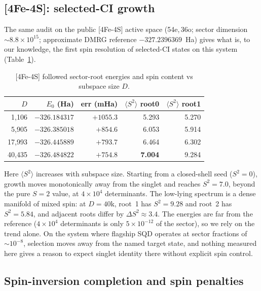 \documentclass[11pt]{article}
\newcommand{\ssq}{\ensuremath{\langle S^2\rangle}}
\begin{document}
\subsection{[4Fe-4S]: selected-CI growth}\label{sec:fe4s4}

The same audit on the public [4Fe-4S] active space (54e,\,36o; sector dimension ${\sim}8.8\times10^{15}$; approximate DMRG reference $-327.2396369$~Ha) gives what is, to our knowledge, the first spin resolution of selected-CI states on this system (Table~\ref{tab:fe4s4}).

\begin{table}[ht]\centering\small
\caption{[4Fe-4S] followed sector-root energies and spin content vs subspace size $D$.}
\label{tab:fe4s4}
\begin{tabular}{rrrrr}
\toprule
$D$ & $E_0$ (Ha) & err (mHa) & \ssq{} root0 & \ssq{} root1 \\
\midrule
1{,}106 & $-326.184317$ & $+1055.3$ & 5.293 & 5.270 \\
5{,}905 & $-326.385018$ & $+854.6$ & 6.053 & 5.914 \\
17{,}993 & $-326.445889$ & $+793.7$ & 6.464 & 6.302 \\
40{,}435 & $-326.484822$ & $+754.8$ & \textbf{7.004} & 9.284 \\
\bottomrule
\end{tabular}
\end{table}

Here \ssq{} increases with subspace size. Starting from a closed-shell seed ($S^2=0$), growth moves monotonically away from the singlet and reaches $S^2=7.0$, beyond the pure $S=2$ value, at $4\times10^4$ determinants. The low-lying spectrum is a dense manifold of mixed spin: at $D=40$k, root~1 has $S^2=9.28$ and root~2 has $S^2=5.84$, and adjacent roots differ by $\Delta S^2\approx3.4$. The energies are far from the reference ($4\times10^4$ determinants is only $5\times10^{-12}$ of the sector), so we rely on the trend alone. On the system where flagship SQD operates at sector fractions of ${\sim}10^{-8}$, selection moves away from the named target state, and nothing measured here gives a reason to expect singlet identity there without explicit spin control.

\subsection{Spin-inversion completion and spin penalties}\label{sec:mitigation}
\end{document}
